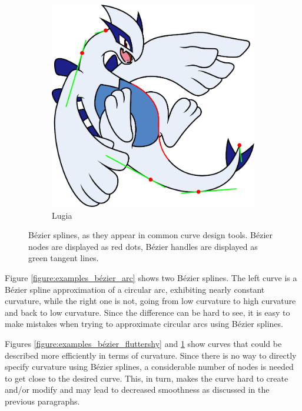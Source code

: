 \documentclass[a4paper]{article}
\begin{document}
\begin{figure}[htb]
\begin{subfigure}[b]{\textwidth / 2}
						\includegraphics[width=\textwidth]{content/output/examples_bezier_lugia.pdf}
						\caption{Lugia \cite{lugia}}
						\label{figure:examples_bézier_lugia}
					\end{subfigure}
					\caption{Bézier splines, as they appear in common curve design tools. Bézier nodes are displayed as red dots, Bézier handles are displayed as green tangent lines.}
					\label{figure:examples_bézier}
				\end{figure}

				Figure \ref{figure:examples_bézier_arc} shows two Bézier splines. The left curve is a Bézier spline approximation of a circular arc, exhibiting nearly constant curvature, while the right one is not, going from low curvature to high curvature and back to low curvature. Since the difference can be hard to see, it is easy to make mistakes when trying to approximate circular arcs using Bézier splines.

				Figures \ref{figure:examples_bézier_fluttershy} and \ref{figure:examples_bézier_lugia} show curves that could be described more efficiently in terms of curvature. Since there is no way to directly specify curvature using Bézier splines, a considerable number of nodes is needed to get close to the desired curve. This, in turn, makes the curve hard to create and/or modify and may lead to decreased smoothness as discussed in the previous paragraphs.
\end{document}
